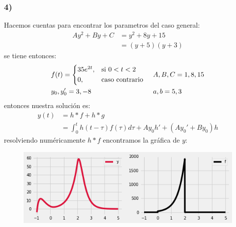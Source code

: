 \documentclass{article}
\begin{document}
\begin{tcolorbox}[breakable]
    \subsubsection*{4)}
    Hacemos cuentas para encontrar los parametros del caso general:
    \begin{align*}
        Ay^2 + By + C 
        &= y^2 + 8y + 15 \\
        &= (y+5)(y+3)
    \end{align*}
    se tiene entonces:
    \begin{align*}
        &f(t) = 
        \begin{cases*}
            35e^{2t}, & si $0<t<2$ \\
            0,& caso contrario
        \end{cases*}
        &&A, B, C = 1,8,15 \\
        &y_0, y_0' = 3,-8
        &&a,b = 5,3 
    \end{align*}
    entonces nuestra solución es:
    \begin{align*}
        y(t) 
        &= h*f + h*g \\
        &= \int_{0}^t h(t-\tau)f(\tau)d\tau + Ay_0h' + (Ay_0'+By_0)h 
    \end{align*}
    resolviendo numéricamente $h*f$ encontramos la gráfica de $y$:
    \begin{figure}[H]
        \centering
        \includegraphics[scale=0.7]{images/p1_4.png}
    \end{figure}
\end{tcolorbox}
\newpage
\end{document}
